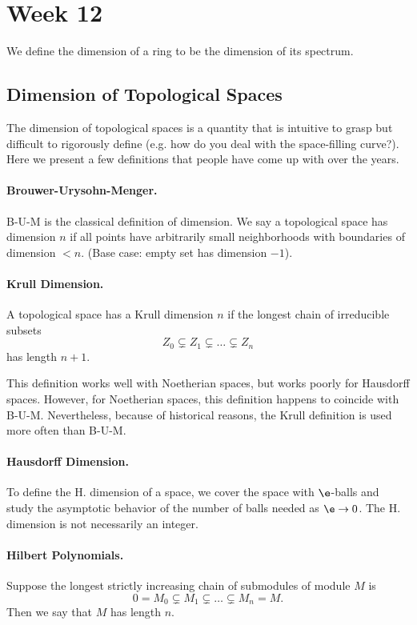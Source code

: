 \section{Week 12}

We define the dimension of a ring to be the dimension of its spectrum.

\subsection{Dimension of Topological Spaces}
The dimension of topological spaces is a quantity that is intuitive to grasp but difficult to rigorously define (e.g. how do you deal with the space-filling curve?). Here we present a few definitions that people have come up with over the years.

\paragraph{Brouwer-Urysohn-Menger.} B-U-M is the classical definition of dimension. We say a topological space has dimension $n$ if all points have arbitrarily small neighborhoods with boundaries of dimension $< n$. (Base case: empty set has dimension $-1$).

\paragraph{Krull Dimension.} A topological space has a Krull dimension $n$ if the longest chain of irreducible subsets
\[
    Z_0 \subsetneq Z_1 \subsetneq \dots \subsetneq Z_n
\]
has length $n+1$.

This definition works well with Noetherian spaces, but works poorly for Hausdorff spaces. However, for Noetherian spaces, this definition happens to coincide with B-U-M. Nevertheless, because of historical reasons, the Krull definition is used more often than B-U-M.

\paragraph{Hausdorff Dimension.} To define the H. dimension of a  space, we cover the space with $\e$-balls and study the asymptotic behavior of the number of balls needed as $\e \to 0$. The H. dimension is not necessarily an integer.

\paragraph{Hilbert Polynomials.} Suppose the longest strictly increasing chain of submodules of module $M$ is
\[
    0 = M_0 \subsetneq M_1 \subsetneq \dots \subsetneq M_n = M.
\]
Then we say that $M$ has length $n$.

